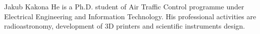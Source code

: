 \documentclass{poster16}
\begin{document}
\begin{authorcv}{Jakub Kakona}
He is a Ph.D. student of  Air Traffic Control programme under Electrical Engineering and Information Technology. His professional activities are radioastronomy, development of 3D printers and scientific instruments design. 
\end{authorcv}
\end{document}
